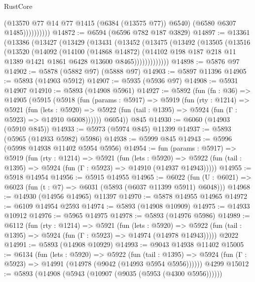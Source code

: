 \begin{lexlean}{RustCore}
\begin{coremodule}
                      (@13570 @77 @14 @77 @1415 (@6384 (@13575 @77)) @6540)
                      (@6580 @6307 @1485))))))))))
@14872 := @6594 (@6596 @782 @187 @3829)
@14897 := @13361
    (@13386
      (@13427
        (@13429
          (@13431
            (@13452
              (@13475
                (@13492
                  (@13505
                    (@13516
                      (@13520
                        (@14092
                          (@14100
                            (@14868 @14872)
                            (@14102
                              @198
                              @187
                              @218
                              @11
                              @1389
                              @1421
                              @1861
                              @6428
                              @13600
                              @8465)))))))))))))
@14898 := @5876 @97
@14902 := @5878 (@5882 @97) (@5888 @97)
@14903 := @5897 @11396
@14905 := @5893 (@14903 @5912)
@14907 := @5935 (@5936 @97)
@14908 := @5931 @14907
@14910 := @5893 (@14908 @5961)
@14927 := @5892
    (fun (fn : @36) =>
    @14905
      (@5915
        (@5918
          (fun (params : @5917) =>
          @5919
            (fun (rty : @1214) =>
            @5921
              (fun (lets : @5920) =>
              @5922 (fun (tail : @1395) => @5924 (fun (Γ : @5923) => @14910 @6008))))))
        @6054))
    @845
@14930 := @6060 (@14903 (@5910 @845))
@14933 := @5973 (@5974 @845) @11399
@14937 := @5893 (@5965 (@14933 @5982) @5986)
@14938 := @5999 @845
@14943 := @5996 (@5998 @14938 @11402 @5954 @5956)
@14954 := fun (params : @5917) =>
  @5919
    (fun (rty : @1214) =>
    @5921
      (fun (lets : @5920) =>
      @5922 (fun (tail : @1395) => @5924 (fun (Γ : @5923) => @14910 (@14937 @14943)))))
@14955 := @5918 @14954
@14956 := @5915 @14955
@14965 := @6022
    (fun (U : @6021) => @6023 (fun (t : @7) => @6031 (@5893 (@6037 @11399 @5911) @6048)))
@14968 := @14930 (@14956 @14965) @11397
@14970 := @5878 @14955 @14965
@14972 := @6109 @14954 @2593
@14974 := @5893 (@14908 @10909)
@14975 := @14933 @10912
@14976 := @5965 @14975
@14978 := @5893 (@14976 @5986)
@14989 := @6112
    (fun (rty : @1214) =>
    @5921
      (fun (lets : @5920) =>
      @5922 (fun (tail : @1395) => @5924 (fun (Γ : @5923) => @14974 (@14978 @14943)))))
    @2022
@14991 := @5893 (@14908 @10929)
@14993 := @9043 @14938 @11402
@15005 := @6134
    (fun (lets : @5920) =>
    @5922
      (fun (tail : @1395) =>
      @5924 (fun (Γ : @5923) => @14991 (@14978 (@9042 (@14993 @5954 @5956))))))
    @4299
@15012 := @5893 (@14908 (@5943 (@10907 (@9035 (@5953 (@4300 @5956))))))

\end{coremodule}
\end{lexlean}
